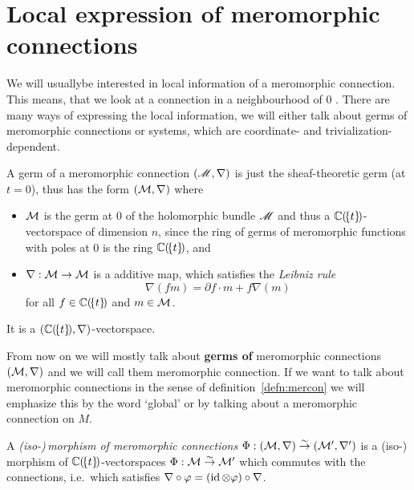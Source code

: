 \section{Local expression of meromorphic connections}
\begin{comment}
  \cite[28]{sabbah2007isomonodromic}, \cite[2]{thboalch} and
  \cite[11]{babbitt1989local}
\end{comment}
We will usually\TODO[only?] be interested in local information of a meromorphic
connection.  This means, that we look at a connection in a neighbourhood of $0$
.
There are many ways of expressing the local information, we will either talk
about germs of meromorphic connections or systems, which are coordinate-
and trivialization-dependent.
\begin{prop}
  A germ of a meromorphic connection $(\mathscr{M},\nabla)$ is just the sheaf-theoretic
  germ (at $t=0$), thus has the form $(\mathcal{M},\nabla)$ where
  \begin{itemize}
    \item $\mathcal{M}$ is the germ at $0$ of the holomorphic bundle $\mathscr{M}$ and thus a
      $\mathbb{C}(\!\{t\}\!)$-vectorspace of dimension $n$, since the ring of germs of
      meromorphic functions with poles at $0$ is the ring $\mathbb{C}(\!\{t\}\!)$, and
    \item $\nabla:\mathcal{M}\to \mathcal{M}$  is a additive map, which
      satisfies the \emph{Leibniz rule}
      \[
        \nabla(fm)=\partial f\cdot m + f\nabla(m)
      \]
      for all $f\in\mathbb{C}(\!\{t\}\!)$ and $m\in \mathcal{M}$.
  \end{itemize}
  \begin{s-rem}
    It is a $(\mathbb{C}(\!\{t\}\!),\nabla)$-vectorspace.
  \end{s-rem}
  \begin{comment}
    \begin{s-rem}
      Loday-Richaud calls this in \cite[Def.4.2.1]{Loday2014} a
      \emph{differential module}.
    \end{s-rem}
  \end{comment}
\end{prop}
\begin{rem}
  From now on we will mostly talk about \textbf{germs of} meromorphic
  connections $(\mathcal{M},\nabla)$ and we will call them meromorphic connection. If
  we want to talk about meromorphic connections in the sense of
  definition~\ref{defn:mercon} we will emphasize this by the word `global' or
  by talking about a meromorphic connection on $M$.
\end{rem}
\begin{defn}
  A \emph{(iso-)\,morphism of meromorphic connections}
  $\Phi:(\mathcal{M},\nabla)\overset{\sim}\to(\mathcal{M}',\nabla')$ is a (iso-)\,morphism of
  $\mathbb{C}(\!\{t\}\!)$-vectorspaces $\Phi:\mathcal{M}\overset{\sim}\to\mathcal{M}'$ which commutes
  with the connections, i.e.\ which satisfies
  $\nabla\circ\varphi = (\operatorname{id}\otimes\varphi)\circ\nabla$.
\end{defn}

